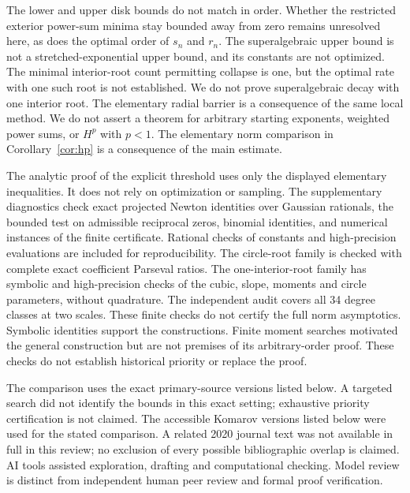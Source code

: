 \documentclass[11pt]{article}
\theoremstyle{remark}\newtheorem{remark}[theorem]{Remark}
\begin{document}
The lower and upper disk bounds do not match in order.
Whether the restricted exterior power-sum minima stay bounded
away from zero remains unresolved here, as does the optimal order
of \(s_n\) and \(r_n\).
The superalgebraic upper bound is not a stretched-exponential upper
bound, and its constants are not optimized. The minimal interior-root
count permitting collapse is one, but the optimal rate with one such
root is not established. We do not prove superalgebraic decay with
one interior root. The elementary radial
barrier is a consequence of the same local method.
We do not assert a theorem for arbitrary starting exponents,
weighted power sums, or \(H^p\) with \(p<1\).
The elementary norm comparison in Corollary~\ref{cor:hp} is a
consequence of the main estimate.

The analytic proof of the explicit threshold uses only the displayed
elementary inequalities. It does not rely on optimization or sampling.
The supplementary diagnostics check exact projected Newton identities
over Gaussian rationals, the bounded test on admissible reciprocal
zeros, binomial identities, and numerical instances of the finite
certificate. Rational checks of constants and high-precision
evaluations are included for reproducibility. The circle-root family
is checked with complete exact coefficient Parseval ratios. The
one-interior-root family has symbolic and high-precision checks of
the cubic, slope, moments and circle parameters, without quadrature.
The independent audit covers all 34 degree classes at two scales.
These finite checks do not certify the full norm asymptotics.
Symbolic identities support the constructions. Finite moment
searches motivated the general construction but are not premises
of its arbitrary-order proof.
These checks do not establish historical priority or replace the proof.

The comparison uses the exact primary-source versions listed below.
A targeted search did not identify the bounds in this exact setting;
exhaustive priority certification is not claimed. The accessible
Komarov versions listed below were used for the stated comparison.
A related 2020 journal text was not available in full in this review;
no exclusion of every possible bibliographic overlap is claimed.
AI tools assisted exploration, drafting and computational checking.
Model review is distinct from independent human peer review and
formal proof verification.
\end{document}

